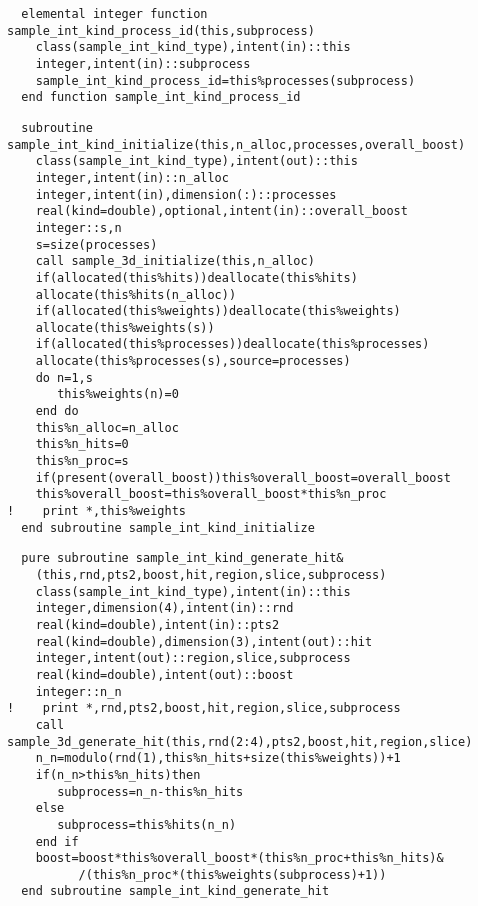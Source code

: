 \begin{Verbatim}
  elemental integer function sample_int_kind_process_id(this,subprocess)
    class(sample_int_kind_type),intent(in)::this
    integer,intent(in)::subprocess
    sample_int_kind_process_id=this%processes(subprocess)
  end function sample_int_kind_process_id
\end{Verbatim}

\begin{Verbatim}
  subroutine sample_int_kind_initialize(this,n_alloc,processes,overall_boost)
    class(sample_int_kind_type),intent(out)::this
    integer,intent(in)::n_alloc
    integer,intent(in),dimension(:)::processes
    real(kind=double),optional,intent(in)::overall_boost
    integer::s,n
    s=size(processes)
    call sample_3d_initialize(this,n_alloc)
    if(allocated(this%hits))deallocate(this%hits)
    allocate(this%hits(n_alloc))
    if(allocated(this%weights))deallocate(this%weights)
    allocate(this%weights(s))
    if(allocated(this%processes))deallocate(this%processes)
    allocate(this%processes(s),source=processes)
    do n=1,s
       this%weights(n)=0
    end do
    this%n_alloc=n_alloc
    this%n_hits=0
    this%n_proc=s
    if(present(overall_boost))this%overall_boost=overall_boost
    this%overall_boost=this%overall_boost*this%n_proc
!    print *,this%weights
  end subroutine sample_int_kind_initialize
\end{Verbatim}
  
\begin{Verbatim}
  pure subroutine sample_int_kind_generate_hit&
    (this,rnd,pts2,boost,hit,region,slice,subprocess)
    class(sample_int_kind_type),intent(in)::this
    integer,dimension(4),intent(in)::rnd
    real(kind=double),intent(in)::pts2
    real(kind=double),dimension(3),intent(out)::hit
    integer,intent(out)::region,slice,subprocess
    real(kind=double),intent(out)::boost
    integer::n_n
!    print *,rnd,pts2,boost,hit,region,slice,subprocess
    call sample_3d_generate_hit(this,rnd(2:4),pts2,boost,hit,region,slice)
    n_n=modulo(rnd(1),this%n_hits+size(this%weights))+1
    if(n_n>this%n_hits)then
       subprocess=n_n-this%n_hits
    else
       subprocess=this%hits(n_n)
    end if
    boost=boost*this%overall_boost*(this%n_proc+this%n_hits)&
          /(this%n_proc*(this%weights(subprocess)+1))
  end subroutine sample_int_kind_generate_hit
\end{Verbatim}

